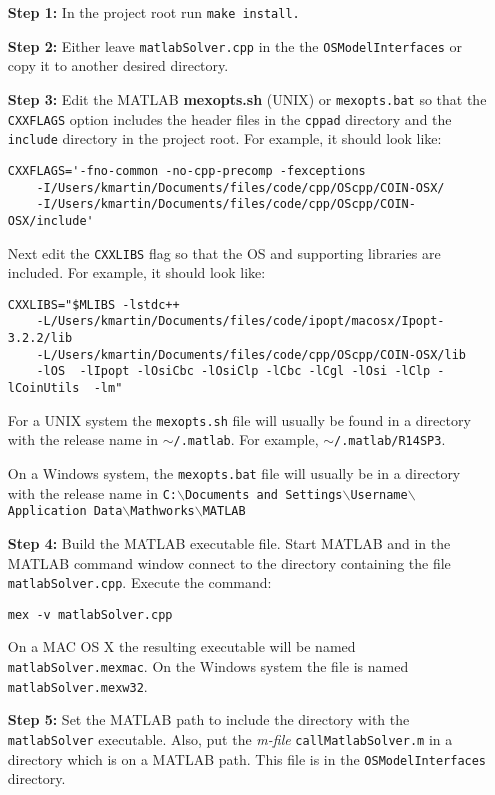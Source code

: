 \documentclass[11pt]{article}
\renewcommand{\_}{{\char"5F}}
\renewcommand{\{}{{\char"7B}}
\renewcommand{\}}{{\char"7D}}
\renewcommand{\^}{{\char"0D}}
\renewcommand{\'}{{\char"0D}}
\begin{document}
\begin{itemize}


\item[{\bf Step  1:}] In the project root run {\tt make install.}

\item[{\bf Step  2:}]   Either leave {\tt matlabSolver.cpp} in the  the {\tt OSModelInterfaces} or copy it to another desired directory.

\item[{\bf Step 3:}] Edit the MATLAB  {\bf mexopts.sh} (UNIX) or {\tt mexopts.bat}  so that the {\tt CXXFLAGS} option includes the header files in the {\tt cppad} directory and the {\tt include} directory in the project root. For example, it  should look like:
\begin{verbatim}
CXXFLAGS='-fno-common -no-cpp-precomp -fexceptions
    -I/Users/kmartin/Documents/files/code/cpp/OScpp/COIN-OSX/
    -I/Users/kmartin/Documents/files/code/cpp/OScpp/COIN-OSX/include'
\end{verbatim}

Next edit the {\tt CXXLIBS} flag so that the OS and supporting libraries are included. For example, it should look like:

\begin{verbatim}
CXXLIBS="$MLIBS -lstdc++
    -L/Users/kmartin/Documents/files/code/ipopt/macosx/Ipopt-3.2.2/lib
    -L/Users/kmartin/Documents/files/code/cpp/OScpp/COIN-OSX/lib
    -lOS  -lIpopt -lOsiCbc -lOsiClp -lCbc -lCgl -lOsi -lClp -lCoinUtils  -lm"
\end{verbatim}

For a UNIX system the {\tt mexopts.sh} file will usually be found in a directory with the release name in {\tt  $\sim$/.matlab}. For example,
{\tt $\sim$/.matlab/R14SP3}.


On a Windows system, the {\tt  mexopts.bat} file will usually be in a directory with the release name in {\tt C:$\backslash$Documents and Settings$\backslash$Username$\backslash$Application Data$\backslash$Mathworks$\backslash$MATLAB}


\item[{\bf Step 4:}]  Build the MATLAB executable file. Start MATLAB and in the MATLAB command window connect to the directory containing the file {\tt matlabSolver.cpp}.  Execute the command:

\begin{verbatim}
mex -v matlabSolver.cpp
\end{verbatim}

On a MAC OS X the resulting executable will be named {\tt matlabSolver.mexmac}. On the Windows system the file is named {\tt matlabSolver.mexw32}.

\item[{\bf Step 5:}]  Set the MATLAB path to include the directory with the {\tt matlabSolver} executable. Also, put  the {\it m-file} {\tt callMatlabSolver.m} in a directory which is on a MATLAB path.  This file is in the {\tt OSModelInterfaces} directory.

\end{itemize}
\end{document}
